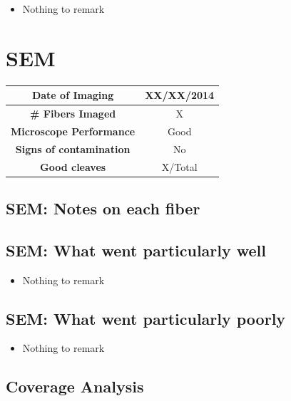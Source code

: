 \documentclass{article}
\begin{document}
\begin{itemize}
\item{Nothing to remark}
\end{itemize}

\hypertarget{sem}{\section{SEM}}

\begin{center}
\begin{tabular}{| c | c |}
 \hline
 {\bf Date of Imaging} & XX/XX/2014 \\ \hline
 {\bf \# Fibers Imaged} & X \\ \hline
 {\bf Microscope Performance} & Good \\ \hline
 {\bf Signs of contamination} & No  \\ \hline
 {\bf Good cleaves} & X/Total  \\ \hline %
\end{tabular}
\end{center}
\gap

\subsection{SEM: Notes on each fiber}

\gap
{}
\bit
\item{}
\eit{}


\subsection{SEM: {\color{blue} What went particularly well}}

\begin{itemize}
\item{Nothing to remark}
\end{itemize}

\subsection{SEM: {\color{red} What went particularly poorly}}

\begin{itemize}
\item{Nothing to remark}
\end{itemize}

\subsection{Coverage Analysis \footnotemark[1]}
\end{document}
